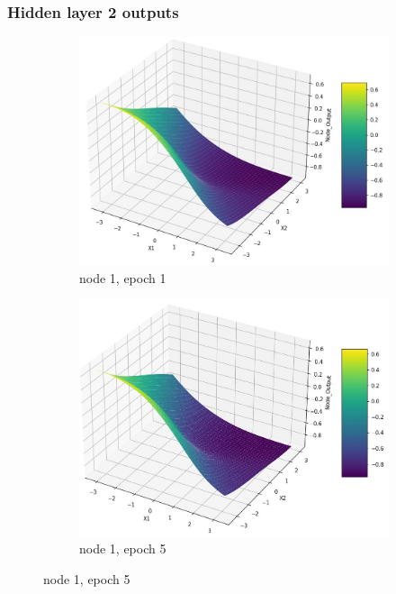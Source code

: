 \documentclass[11pt]{article}
\begin{document}
\subsubsection{Hidden layer 2 outputs}
\begin{figure}[h!]
\centering
	\begin{subfigure}[b]{0.3\textwidth}
	\centering
	\includegraphics[scale=0.14]{hidden2_n1_e1.jpg}
	\caption{node 1, epoch 1}
	\label{fig:fig2.1.6.1}
	\end{subfigure}
	\begin{subfigure}[b]{0.3\textwidth}
	\centering
	\includegraphics[scale=0.14]{hidden2_n1_e5.jpg}
	\caption{node 1, epoch 5}
	\label{fig:fig2.1.6.2}
	\end{subfigure}

\end{figure}
\end{document}
